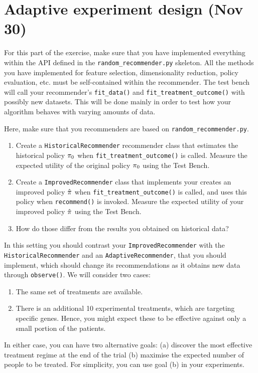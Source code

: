 \section{Adaptive experiment design (Nov 30)}
For this part of the exercise, make sure that you have implemented everything within the API defined in the \verb!random_recommender.py! skeleton. All the methods you have implemented for feature selection, dimensionality reduction, policy evaluation, etc. must be self-contained within the recommender. The test bench will call your recommender's \verb!fit_data()! and \verb!fit_treatment_outcome()! with possibly new datasets. This will be done mainly in order to test how your algorithm behaves with varying amounts of data.
\begin{exercise}
  Here, make sure that you recommenders are based on \verb!random_recommender.py!.
  \begin{enumerate}
  \item Create a \texttt{HistoricalRecommender} recommender class that estimates the historical policy $\pi_0$ when \verb!fit_treatment_outcome()! is called. Measure the expected utility of the original policy $\pi_0$ using the Test Bench.
  \item Create a \texttt{ImprovedRecommender} class that implements your creates an improved policy $\hat{\pi}$ when \verb!fit_treatment_outcome()! is called, and uses this policy when \verb!recommend()! is invoked. Measure the expected utility of your improved policy $\hat{\pi}$ using the Test Bench.
  \item How do those differ from the results you obtained on historical data?
  \end{enumerate}
\end{exercise}

\begin{exercise}
  In this setting you should contrast your \texttt{ImprovedRecommender} with the \texttt{HistoricalRecommender} and an \texttt{AdaptiveRecommender}, that you should implement, which should change its recommendations as it obtains new data through \verb!observe()!. We will consider two cases:
  \begin{enumerate}
  \item The same set of treatments are available.
  \item There is an additional 10 experimental treatments, which are targeting specific genes. Hence, you might expect these to be effective against only a small portion of the patients. 
  \end{enumerate}
  In either case, you can have two alternative goals: (a) discover the most effective treatment regime at the end of the trial (b) maximise the expected number of people to be treated. For simplicity, you can use goal (b) in your experiments.
\end{exercise}






